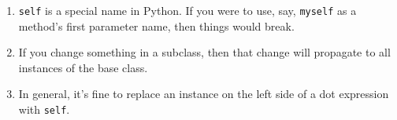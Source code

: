 \documentclass[twoside]{article}
\begin{document}
\begin{enumerate}
\begin{enumerate}
\item \texttt{self} is a special name in Python. If you were to use, say, \texttt{myself} as a method's first parameter name, then things would break.\\

\item If you change something in a subclass, then that change will propagate to all instances of the base class.\\

\item In general, it's fine to replace an instance on the left side of a dot expression with \texttt{self}.

\end{enumerate}

\end{enumerate}
\end{document}
